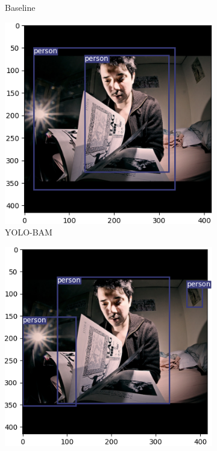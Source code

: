 \begin{figure}[!htbp]
\begin{subfigure}{.2\textwidth}
  \caption{Baseline}
  \label{fig:basenews}
\end{subfigure}%
\begin{subfigure}{.2\textwidth}
  \centering
  \includegraphics[width=\textwidth]{images/CBAM_newspaper.png}
  \caption{YOLO-BAM}
  \label{fig:cbamnews}
\end{subfigure}%
\begin{subfigure}{.2\textwidth}
  \centering
  \includegraphics[width=\textwidth]{images/DSC_newspaper.png}

\end{subfigure}
\end{figure}
